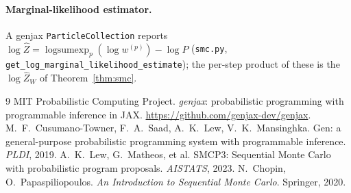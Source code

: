 \documentclass[11pt]{article}
\newcommand{\lse}{\operatorname{logsumexp}}
\newcommand{\code}[1]{\texttt{#1}}
\begin{document}
\paragraph{Marginal-likelihood estimator.} A genjax \code{ParticleCollection} reports
$\log\widehat Z = \lse_p(\log w^{(p)}) - \log P$ (\code{smc.py},
\code{get\_log\_marginal\_likelihood\_estimate}); the per-step product of these is the
$\log\widehat Z_W$ of Theorem~\ref{thm:smc}.

\begin{thebibliography}{9}
 MIT Probabilistic Computing Project. \emph{genjax}: probabilistic programming with
programmable inference in JAX. \url{https://github.com/genjax-dev/genjax}.
 M.~F.~Cusumano-Towner, F.~A.~Saad, A.~K.~Lew, V.~K.~Mansinghka. Gen: a
general-purpose probabilistic programming system with programmable inference. \emph{PLDI}, 2019.
 A.~K.~Lew, G.~Matheos, et al. SMCP3: Sequential Monte Carlo with probabilistic
program proposals. \emph{AISTATS}, 2023.
 N.~Chopin, O.~Papaspiliopoulos. \emph{An Introduction to Sequential Monte Carlo}.
Springer, 2020.
\end{thebibliography}
\end{document}
